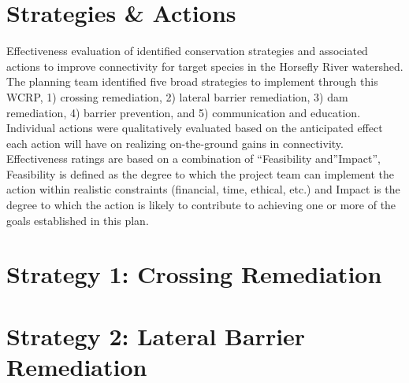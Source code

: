 \documentclass[
  letterpaper,
  DIV=11,
  numbers=noendperiod]{scrreprt}
\begin{document}
\hypertarget{strategies-actions}{%
\section*{Strategies \& Actions}\label{strategies-actions}}


Effectiveness evaluation of identified conservation strategies and
associated actions to improve connectivity for target species in the
Horsefly River watershed. The planning team identified five broad
strategies to implement through this WCRP, 1) crossing remediation, 2)
lateral barrier remediation, 3) dam remediation, 4) barrier prevention,
and 5) communication and education. Individual actions were
qualitatively evaluated based on the anticipated effect each action will
have on realizing on-the-ground gains in connectivity. Effectiveness
ratings are based on a combination of ``Feasibility and''Impact'',
Feasibility is defined as the degree to which the project team can
implement the action within realistic constraints (financial, time,
ethical, etc.) and Impact is the degree to which the action is likely to
contribute to achieving one or more of the goals established in this
plan.

\hypertarget{strategy-1-crossing-remediation}{%
\section*{Strategy 1: Crossing
Remediation}\label{strategy-1-crossing-remediation}}


\begin{table}

\end{table}

\hypertarget{strategy-2-lateral-barrier-remediation}{%
\section*{Strategy 2: Lateral Barrier
Remediation}\label{strategy-2-lateral-barrier-remediation}}

\end{document}
